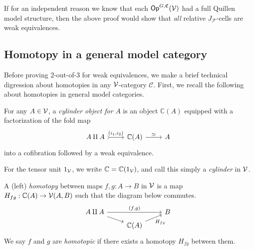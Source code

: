 \documentclass[a4paper,10pt
,draft
]{article}%
\renewcommand{\F}{\mathcal F}
\renewcommand{\1}{\eta}%
\begin{document}
\begin{remark}
      \label{OPGCV_F_JC_REM}
      If for an independent reason we know that each $\mathsf{Op}^{G, \mathfrak C}(\mathcal V)$ had a full Quillen model structure,
      then the above proof would show that \textit{all} relative $J_\F$-cells are weak equivalences.
\end{remark}


\subsection{Homotopy in a general model category}

Before proving 2-out-of-3 for weak equivalences, we make a brief technical digression about homotopies in any $\mathcal V$-category $\mathcal C$.
First, we recall the following about homotopies in general model categories.
\begin{definition}
      For any $A \in \mathcal V$, a \textit{cylinder object for $A$} is an object $\mathbb C(A)$ equipped with a factorization of the fold map
      \begin{equation}
            \begin{tikzcd}
                  A \amalg A \arrow[r, tail, "{(i_1,i_2)}"]
                  &
                  \mathbb C(A) \arrow[r, "\simeq"]
                  &
                  A
            \end{tikzcd}
      \end{equation}
      into a cofibration followed by a weak equivalence.
      
      For the tensor unit $1_{\mathcal V}$, we write $\mathbb C = \mathbb C(1_{\mathcal V})$, and call this simply a \textit{cylinder} in $\mathcal V$.
      
      A (left) \textit{homotopy} between maps $f,g: A \to B$ in $\mathcal V$ is a map $H_{fg}: \mathbb C(A) \to \mathcal V(A,B)$ such that
      the diagram below commutes.
      \begin{equation}
            \begin{tikzcd}[row sep = tiny]
                  A \amalg A \arrow[rr, "{(f,g)}"] \arrow[dr]
                  &&
                  B
                  \\
                  &
                  \mathbb C(A) \arrow[ur, "H_{fg}"']
            \end{tikzcd}
      \end{equation}
      We say $f$ and $g$ are \textit{homotopic} if there exists a homotopy $H_{f g}$ between them.
\end{definition}
\end{document}
